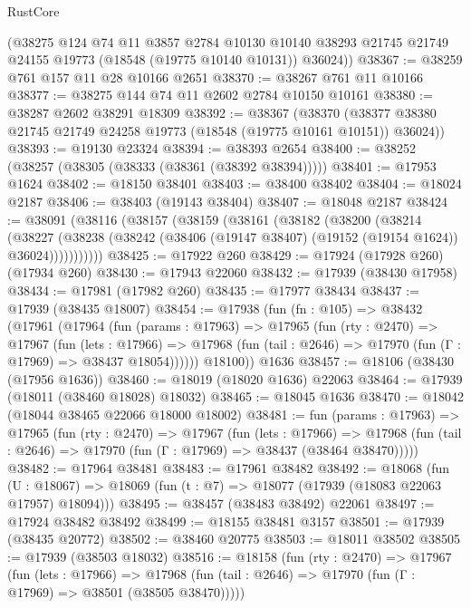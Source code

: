 \begin{lexlean}{RustCore}
\begin{coremodule}
      (@38275
        @124
        @74
        @11
        @3857
        @2784
        @10130
        @10140
        @38293
        @21745
        @21749
        @24155
        @19773
        (@18548 (@19775 @10140 @10131))
        @36024))
@38367 := @38259 @761 @157 @11 @28 @10166 @2651
@38370 := @38267 @761 @11 @10166
@38377 := @38275 @144 @74 @11 @2602 @2784 @10150 @10161
@38380 := @38287 @2602 @38291 @18309
@38392 := @38367
    (@38370 (@38377 @38380 @21745 @21749 @24258 @19773 (@18548 (@19775 @10161 @10151)) @36024))
@38393 := @19130 @23324
@38394 := @38393 @2654
@38400 := @38252 (@38257 (@38305 (@38333 (@38361 (@38392 @38394)))))
@38401 := @17953 @1624
@38402 := @18150 @38401
@38403 := @38400 @38402
@38404 := @18024 @2187
@38406 := @38403 (@19143 @38404)
@38407 := @18048 @2187
@38424 := @38091
    (@38116
      (@38157
        (@38159
          (@38161
            (@38182
              (@38200
                (@38214
                  (@38227
                    (@38238
                      (@38242 (@38406 (@19147 @38407) (@19152 (@19154 @1624)) @36024)))))))))))
@38425 := @17922 @260
@38429 := @17924 (@17928 @260) (@17934 @260)
@38430 := @17943 @22060
@38432 := @17939 (@38430 @17958)
@38434 := @17981 (@17982 @260)
@38435 := @17977 @38434
@38437 := @17939 (@38435 @18007)
@38454 := @17938
    (fun (fn : @105) =>
    @38432
      (@17961
        (@17964
          (fun (params : @17963) =>
          @17965
            (fun (rty : @2470) =>
            @17967
              (fun (lets : @17966) =>
              @17968 (fun (tail : @2646) => @17970 (fun (Γ : @17969) => @38437 @18054))))))
        @18100))
    @1636
@38457 := @18106 (@38430 (@17956 @1636))
@38460 := @18019 (@18020 @1636) @22063
@38464 := @17939 (@18011 (@38460 @18028) @18032)
@38465 := @18045 @1636
@38470 := @18042 (@18044 @38465 @22066 @18000 @18002)
@38481 := fun (params : @17963) =>
  @17965
    (fun (rty : @2470) =>
    @17967
      (fun (lets : @17966) =>
      @17968 (fun (tail : @2646) => @17970 (fun (Γ : @17969) => @38437 (@38464 @38470)))))
@38482 := @17964 @38481
@38483 := @17961 @38482
@38492 := @18068
    (fun (U : @18067) => @18069 (fun (t : @7) => @18077 (@17939 (@18083 @22063 @17957) @18094)))
@38495 := @38457 (@38483 @38492) @22061
@38497 := @17924 @38482 @38492
@38499 := @18155 @38481 @3157
@38501 := @17939 (@38435 @20772)
@38502 := @38460 @20775
@38503 := @18011 @38502
@38505 := @17939 (@38503 @18032)
@38516 := @18158
    (fun (rty : @2470) =>
    @17967
      (fun (lets : @17966) =>
      @17968 (fun (tail : @2646) => @17970 (fun (Γ : @17969) => @38501 (@38505 @38470)))))

\end{coremodule}
\end{lexlean}
